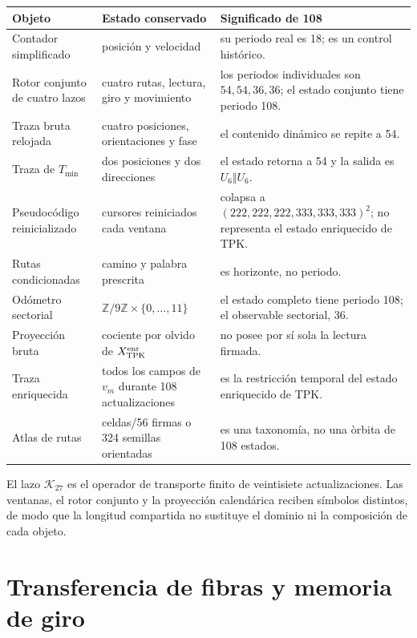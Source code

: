 \begin{longtable}{@{}>{\raggedright\arraybackslash}p{}>{\raggedright\arraybackslash}p{}>{\raggedright\arraybackslash}p{}@{}}
\toprule
Objeto&Estado conservado&Significado de 108\\\midrule
\endhead
Contador simplificado&posici\'on y velocidad&su periodo real es 18; es un
control hist\'orico.\\
Rotor conjunto de cuatro lazos&cuatro rutas, lectura, giro y movimiento&
los periodos individuales son \(54,54,36,36\); el estado conjunto tiene
periodo 108.\\
Traza bruta relojada&cuatro posiciones, orientaciones y fase&el contenido
din\'amico se repite a 54.\\
Traza de \(T_{\min}\)&dos posiciones y dos direcciones&el estado retorna a
54 y la salida es \(U_6\Vert U_6\).\\
Pseudoc\'odigo reinicializado&cursores reiniciados cada ventana&colapsa a
\((222,222,222,333,333,333)^2\); no representa el estado enriquecido de TPK.\\
Rutas condicionadas&camino y palabra prescrita&108 es horizonte, no periodo.\\
Od\'ometro sectorial&\(\mathbb Z/9\mathbb Z\times\{0,\ldots,11\}\)&el
estado completo tiene periodo 108; el observable sectorial, 36.\\
Proyecci\'on bruta&cociente por olvido de \(X_{\rm TPK}^{\rm enr}\)&no posee
por s\'i sola la lectura firmada.\\
Traza enriquecida&todos los campos de \(v_m\) durante 108 actualizaciones&es
la restricci\'on temporal del estado enriquecido de TPK.\\
Atlas de rutas&81 celdas/56 firmas o 324 semillas orientadas&es una taxonom\'ia,
no una \`orbita de 108 estados.\\
\bottomrule
\end{longtable}

El lazo \(\mathcal K_{27}\) es el operador de transporte finito de
veintisiete actualizaciones. Las ventanas, el rotor conjunto y la proyección
calendárica reciben símbolos distintos, de modo que la longitud compartida
no sustituye el dominio ni la composición de cada objeto.

\section{Transferencia de fibras y memoria de giro}

